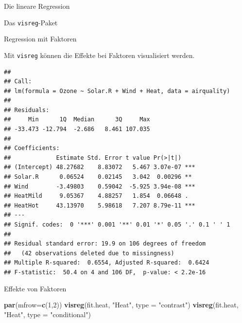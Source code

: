 \documentclass[ignorenonframetext,]{beamer}
\newenvironment{Shaded}{}{}
\newcommand{\KeywordTok}[1]{\textcolor[rgb]{0.00,0.44,0.13}{\textbf{{#1}}}}
\newcommand{\DataTypeTok}[1]{\textcolor[rgb]{0.56,0.13,0.00}{{#1}}}
\newcommand{\DecValTok}[1]{\textcolor[rgb]{0.25,0.63,0.44}{{#1}}}
\newcommand{\StringTok}[1]{\textcolor[rgb]{0.25,0.44,0.63}{{#1}}}
\newcommand{\NormalTok}[1]{{#1}}
\begin{document}
\begin{frame}[fragile]{Die lineare Regression}
\begin{block}{Das \texttt{visreg}-Paket}
\end{block}

\begin{block}{Regression mit Faktoren}

Mit \texttt{visreg} können die Effekte bei Faktoren visualisiert werden.

\begin{Shaded}
\end{Shaded}

\begin{verbatim}
## 
## Call:
## lm(formula = Ozone ~ Solar.R + Wind + Heat, data = airquality)
## 
## Residuals:
##     Min      1Q  Median      3Q     Max 
## -33.473 -12.794  -2.686   8.461 107.035 
## 
## Coefficients:
##             Estimate Std. Error t value Pr(>|t|)    
## (Intercept) 48.27682    8.83072   5.467 3.07e-07 ***
## Solar.R      0.06524    0.02145   3.042  0.00296 ** 
## Wind        -3.49803    0.59042  -5.925 3.94e-08 ***
## HeatMild     9.05367    4.88257   1.854  0.06648 .  
## HeatHot     43.13970    5.98618   7.207 8.79e-11 ***
## ---
## Signif. codes:  0 '***' 0.001 '**' 0.01 '*' 0.05 '.' 0.1 ' ' 1
## 
## Residual standard error: 19.9 on 106 degrees of freedom
##   (42 observations deleted due to missingness)
## Multiple R-squared:  0.6554, Adjusted R-squared:  0.6424 
## F-statistic:  50.4 on 4 and 106 DF,  p-value: < 2.2e-16
\end{verbatim}

\end{block}

\begin{block}{Effekte von Faktoren}

\begin{Shaded}
\begin{Highlighting}[]
\KeywordTok{par}\NormalTok{(}\DataTypeTok{mfrow=}\KeywordTok{c}\NormalTok{(}\DecValTok{1}\NormalTok{,}\DecValTok{2}\NormalTok{))}
\KeywordTok{visreg}\NormalTok{(fit.heat, }\StringTok{"Heat"}\NormalTok{, }\DataTypeTok{type =} \StringTok{"contrast"}\NormalTok{)}
\KeywordTok{visreg}\NormalTok{(fit.heat, }\StringTok{"Heat"}\NormalTok{, }\DataTypeTok{type =} \StringTok{"conditional"}\NormalTok{)}
\end{Highlighting}
\end{Shaded}


\end{block}
\end{frame}
\end{document}
